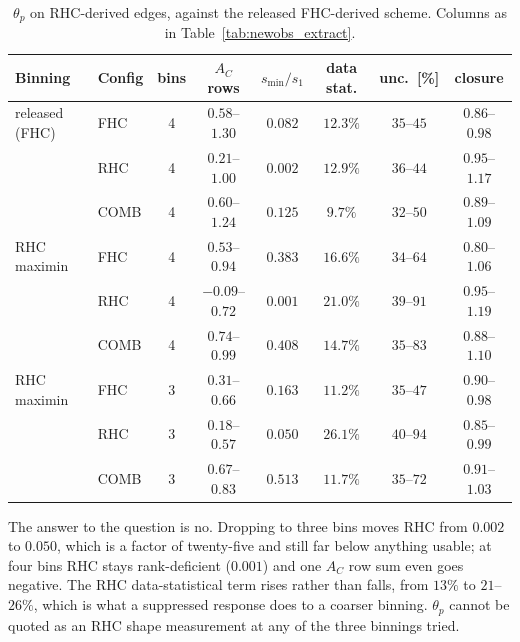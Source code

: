 \begin{table}[H]
  \centering
  \caption{$\theta_p$ on RHC-derived edges, against the released FHC-derived scheme. Columns as in
    Table~\ref{tab:newobs_extract}.}
  \label{tab:thetap_rhc}
  \small
  \begin{tabular}{llcccccc}
    \toprule
    Binning & Config & bins & $A_C$ rows & $s_{\min}/s_1$ & data stat. & unc.\ [\%] & closure \\
    \midrule
    released (FHC) & FHC & 4 & $0.58$--$1.30$ & $0.082$ & $12.3\%$ & $35$--$45$ & $0.86$--$0.98$ \\
                   & RHC & 4 & $0.21$--$1.00$ & $0.002$ & $12.9\%$ & $36$--$44$ & $0.95$--$1.17$ \\
                   & COMB & 4 & $0.60$--$1.24$ & $0.125$ & $9.7\%$ & $32$--$50$ & $0.89$--$1.09$ \\
    RHC maximin & FHC & 4 & $0.53$--$0.94$ & $\mathbf{0.383}$ & $16.6\%$ & $34$--$64$ & $0.80$--$1.06$ \\
                & RHC & 4 & $-0.09$--$0.72$ & $0.001$ & $21.0\%$ & $39$--$91$ & $0.95$--$1.19$ \\
                & COMB & 4 & $0.74$--$0.99$ & $\mathbf{0.408}$ & $14.7\%$ & $35$--$83$ & $0.88$--$1.10$ \\
    RHC maximin & FHC & 3 & $0.31$--$0.66$ & $0.163$ & $11.2\%$ & $35$--$47$ & $0.90$--$0.98$ \\
                & RHC & 3 & $0.18$--$0.57$ & $0.050$ & $26.1\%$ & $40$--$94$ & $0.85$--$0.99$ \\
                & COMB & 3 & $0.67$--$0.83$ & $\mathbf{0.513}$ & $11.7\%$ & $35$--$72$ & $0.91$--$1.03$ \\
    \bottomrule
  \end{tabular}
\end{table}

The answer to the question is no. Dropping to three bins moves RHC from $0.002$ to $0.050$, which is
a factor of twenty-five and still far below anything usable; at four bins RHC stays rank-deficient
($0.001$) and one $A_C$ row sum even goes negative. The RHC data-statistical term rises rather than
falls, from $13\%$ to $21$--$26\%$, which is what a suppressed response does to a coarser binning.
$\theta_p$ cannot be quoted as an RHC shape measurement at any of the three binnings tried.

